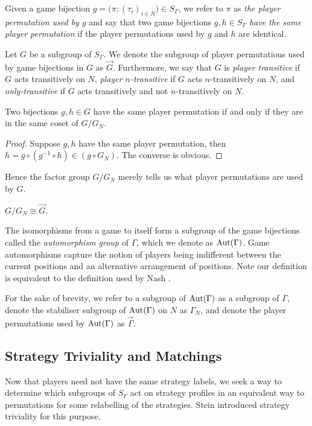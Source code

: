 Given a game bijection $g = \bigl(\pi; (\tau_i)_{i \in N}\bigr) \in S_{\Gamma}$, we refer to $\pi$ as \textit{the player permutation used by $g$} and say that two game bijections $g, h \in S_{\Gamma}$ \textit{have the same player permutation} if the player permutations used by $g$ and $h$ are identical. 

Let $G$ be a subgroup of $S_{\Gamma}$. We denote the subgroup of player permutations used by game bijections in $G$ as $\overrightarrow{G}$. Furthermore, we say that $G$ is \textit{player transitive} if $G$ acts transitively on $N$, \textit{player $n$-transitive} if $G$ acts $n$-transitively on $N$, and \textit{only-transitive} if $G$ acts transitively and not $n$-transitively on $N$.

\begin{lemma} \label{cosetprop}
	Two bijections $g, h \in G$ have the same player permutation if and only if they are in the same coset of $G/G_N$.
	\begin{proof}
		Suppose $g , h$ have the same player permutation, then $h = g \circ (g^{-1} \circ h) \in (g \circ G_N)$. The converse is obvious.
	\end{proof}
\end{lemma}

Hence the factor group $G/G_N$ merely tells us what player permutations are used by $G$. 

\begin{corollary} \label{cosetcor}
	$G/G_N \cong \overrightarrow{G}$.
\end{corollary}

The isomorphisms from a game to itself form a subgroup of the game bijections called the \textit{automorphism group} of $\Gamma$, which we denote as $\operatorname*{Aut}(\Gamma)$. Game automorphisms capture the notion of players being indifferent between the current positions and an alternative arrangement of positions. Note our definition is equivalent to the definition used by Nash \cite{NashNCG}.

For the sake of brevity, we refer to a subgroup of $\operatorname*{Aut}(\Gamma)$ as a subgroup of $\Gamma$, denote the stabiliser subgroup of $\operatorname*{Aut}(\Gamma)$ on $N$ as $\Gamma_N$, and denote the player permutations used by $\operatorname*{Aut}(\Gamma)$ as $\overrightarrow{\Gamma}$.

\subsection{Strategy Triviality and Matchings}
Now that players need not have the same strategy labels, we seek a way to determine which subgroups of $S_{\Gamma}$ act on strategy profiles in an equivalent way to permutations for some relabelling of the strategies. Stein \cite{NoahXE} introduced strategy triviality for this purpose.

